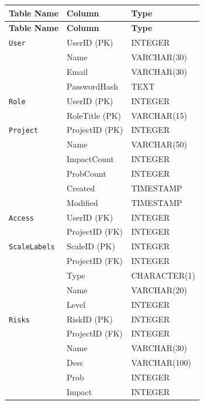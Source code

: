 \documentclass[letterpaper,12pt,oneside,listof=totoc,parskip=full]{scrreprt}
\begin{document}
\begin{longtable}{|l|l|l|}
\hline
\textbf{Table Name} & \textbf{Column} & \textbf{Type} \\
\hline
\endfirsthead

\hline
\textbf{Table Name} & \textbf{Column} & \textbf{Type} \\
\hline
\endhead

\hline
\endfoot

\hline
\endlastfoot
\texttt{User} & UserID (PK) & INTEGER \\
               & Name & VARCHAR(30) \\
               & Email & VARCHAR(30) \\
               & PasswordHash & TEXT \\

\hline
\texttt{Role} & UserID (PK) & INTEGER \\
               & RoleTitle (PK) & VARCHAR(15) \\
            
\hline
\texttt{Project} & ProjectID (PK) & INTEGER \\
                  & Name & VARCHAR(50) \\
                  & ImpactCount & INTEGER \\
                  & ProbCount & INTEGER \\
                  & Created & TIMESTAMP \\
                  & Modified & TIMESTAMP \\
                  
\hline
\texttt{Access} & UserID (FK) & INTEGER \\
               & ProjectID (FK) & INTEGER \\
                  
\hline
\texttt{ScaleLabels} & ScaleID (PK) & INTEGER \\
                  & ProjectID (FK) & INTEGER \\
                  & Type & CHARACTER(1) \\
                  & Name & VARCHAR(20) \\
                  & Level & INTEGER \\
                  
\hline
\texttt{Risks} & RiskID (PK) & INTEGER \\
               & ProjectID (FK) & INTEGER \\
               & Name & VARCHAR(30) \\
               & Desc & VARCHAR(100) \\
               & Prob & INTEGER \\
               & Impact & INTEGER \\
               

\end{longtable}
\end{document}
